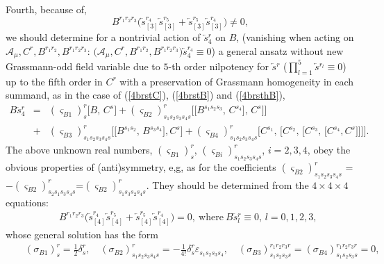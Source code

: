 \documentclass[10pt]{article}
\begin{document}
 Fourth, because of,
\begin{equation}\label{consistB34}
B^{r_1r_2r_3}\big(\overleftarrow{s}{}^{r_4}_{[3]}\overleftarrow{s}{}^{r_5}_{[3]}
+\overleftarrow{s}{}^{r_5}_{[3]}\overleftarrow{s}{}^{r_4}_{[3]}\big) \ne 0,
\end{equation}
we should determine for a nontrivial action of $\overleftarrow{s}{}^{r}_4$ on ${B}$, (vanishing when acting on $\mathcal{A}_\mu, C^r, B^{r_1r_2}, B^{r_1r_2r_3}$: $\big(\mathcal{A}_\mu,C^r, B^{r_1r_2}, B^{r_1r_2r_3}\big)\overleftarrow{s}{}^{r_4}_{4} \equiv 0$)
 a general ansatz  without new  Grassmann-odd field variable due to $5$-th order  nilpotency for  $\overleftarrow{s}{}^r$
 ($\prod_{l=1}^5\overleftarrow{s}{}^{r_l}\equiv 0$)
up to the fifth order in $C^r$ with a preservation of Grassmann homogeneity
in each summand, as in the case of (\ref{4brstC}), (\ref{4brstB}) and (\ref{4brsthB}),
\begin{eqnarray}
B \overleftarrow{s}{}^r_4 & = & (\varsigma_{{B}1})_{s}^{r}  \big[B,\,C^s\big]+ (\varsigma_{{B}2})_{s_1s_2s_3s_4s}^{r}  \big[\big[B^{s_1s_2s_3},\,C^{s_4}\big],\,C^{s}\big]\big] \nonumber \\
&+& (\varsigma_{{B}3})^{r}_{s_1s_2s_3s_4s}  \big[\big[B^{s_1s_2},\,B^{s_3s_4}\big],C^s\big] +(\varsigma_{{B}4})^{r}_{s_1s_2s_3s_4s}  \big[C^{s_1},\,\big[C^{s_2},\,\big[C^{s_3},\,\big[C^{s_4},C^s\big]\big]\big]\big].\label{4brstBlast}
\end{eqnarray}
 The above unknown real numbers, $(\varsigma_{{B}1})^{r}_{s}$, $(\varsigma_{{B}i})^{r}_{s_1s_2s_3s_4s}$, $i=2,3,4$,  obey the obvious  properties of (anti)symmetry, e,g,  as for the coefficients $(\varsigma_{{B}2})_{s_1s_2s_3s_4s}^{r}$ = $-(\varsigma_{{B}2})_{s_2s_1s_3s_4s}^{r}$=$(\varsigma_{{B}2})_{s_1s_3s_2s_4s}^{r}$.
They should be determined from the $4\times 4\times 4$ equations:
\begin{eqnarray}\label{consistB4l}
&&  B^{r_1r_2r_3}\big(\overleftarrow{s}{}^{r_4}_{[4]}\overleftarrow{s}{}^{r_5}_{[4]}+\overleftarrow{s}{}^{r_5}_{[4]}\overleftarrow{s}{}^{r_4}_{[4]}\big) =0, \ \mathrm{where} \ B \overleftarrow{s}{}^{r}_{l}\equiv 0,\,  l=0,1,2,3, \end{eqnarray}
whose general  solution has the form
\begin{eqnarray}\label{solconstB4l}
  && (\sigma_{B1})^{r}_{s}  = \frac{1}{2}  \delta^{r}_{s}, \quad  (\sigma_{{B}2})^{r}_{s_1s_2s_3s_4s}   =  -\frac{1}{4!}\delta^{r}_{s} \varepsilon_{s_1s_2s_3s_4}  ,\quad  (\sigma_{{B}3})^{r_1r_2r_3r}_{s_1s_2s_3s} = (\sigma_{{B}4})^{r_1r_2r_3r}_{s_1s_2s_3s} =0 \label{solconstB4l2},
\end{eqnarray}
\end{document}
